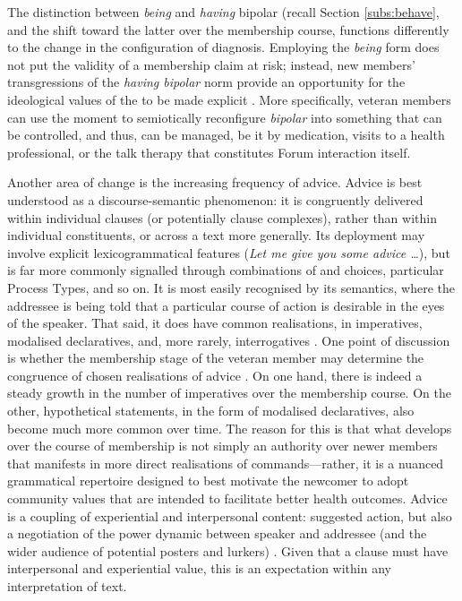 The distinction between \emph{being} and \emph{having} \gls{bipolar} (recall Section \ref{subs:behave}, and the shift toward the latter over the membership course, functions differently to the change in the configuration of diagnosis. Employing the \emph{being} form does not put the validity of a membership claim at risk; instead, new \glspl{member}' transgressions of the \emph{having bipolar} norm provide an opportunity for the ideological values of the  to be made explicit \cite{weber_missed_2011}. More specifically, veteran \glspl{member} can use the moment to semiotically reconfigure \emph{bipolar} into something that can be controlled, and thus, can be managed, be it by medication, visits to a health professional, or the talk therapy that constitutes \gls{Forum} interaction itself.

Another area of change is the increasing frequency of advice. Advice is best understood as a \gls{discourse-semantic} phenomenon: it is congruently delivered within individual clauses (or potentially clause complexes), rather than within individual constituents, or across a text more generally. Its deployment may involve explicit lexicogrammatical features (\emph{Let me give you some advice \dots}), but is far more commonly signalled through combinations of  and  choices, particular Process Types, and so on. It is most easily recognised by its semantics, where the addressee is being told that a particular course of action is desirable in the eyes of the speaker. That said, it does have common  realisations, in imperatives, modalised declaratives, and, more rarely, interrogatives \cite{locher2006advice}. One point of discussion is whether the membership stage of the veteran member may determine the congruence of chosen realisations of advice \cite{decapua_`if_1995}. On one hand, there is indeed a steady growth in the number of imperatives over the membership course. On the other, hypothetical statements, in the form of modalised declaratives, also become much more common over time. The reason for this is that what develops over the course of membership is not simply an authority over newer \glspl{member} that manifests in more direct realisations of commands---rather, it is a nuanced grammatical repertoire designed to best motivate the newcomer to adopt community values that are intended to facilitate better health outcomes. Advice is a coupling of experiential and interpersonal content: suggested action, but also a negotiation of the power dynamic between speaker and addressee (and the wider audience of potential posters and lurkers) \cite{harrison2009politeness}. Given that a clause must have interpersonal and experiential value, this is an expectation within any  interpretation of text.

